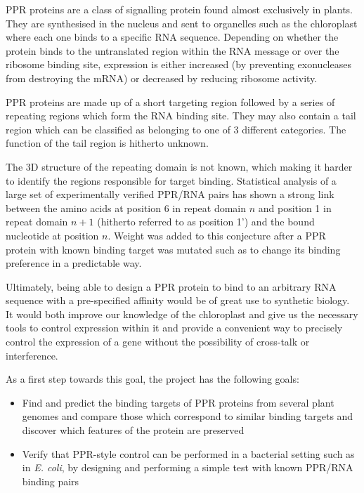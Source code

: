 \documentclass[twoside,a4paper]{article}
\begin{document}
\begin{multicols}{2}
PPR proteins are a class of signalling protein found almost exclusively in
plants\cite{Small2000}. 
They are synthesised in the nucleus and sent to organelles such as the 
chloroplast where each one binds to a specific RNA sequence.
Depending on whether the protein binds to the untranslated region within the
RNA message or over the ribosome binding site, expression is either increased 
(by preventing exonucleases from destroying the mRNA) or decreased by reducing 
ribosome activity\cite{Pfalz2009}.

PPR proteins are made up of a short targeting region followed by a series of
repeating regions which form the RNA binding site.
They may also contain a tail region which can be classified as
belonging to one of 3 different categories. 
The function of the tail region is hitherto unknown\cite{Lurin2004}.

The 3D structure of the repeating domain is not known, which making it harder
to identify the regions responsible for target binding.
Statistical analysis of a large set of experimentally verified PPR/RNA pairs
has shown a strong link between the amino acids at position 6 in repeat domain
$n$ and position 1 in repeat domain $n+1$ (hitherto referred to as position 1')
and the bound nucleotide at position $n$\cite{Barkan2012}.
Weight was added to this conjecture after a PPR protein with known binding
target was mutated such as to change its binding preference in a predictable
way\cite{Barkan2012}.

Ultimately, being able to design a PPR protein to bind to an arbitrary RNA
sequence with a pre-specified affinity would be of great use to synthetic
biology.
It would both improve our knowledge of the chloroplast and give us the
necessary tools to control expression within it and provide a convenient way to
precisely control the expression of a gene without the possibility of 
cross-talk or interference.

As a first step towards this goal, the project has the following goals:
\begin{itemize}
  \item Find and predict the binding targets of PPR proteins from several plant 
    genomes and compare those which correspond to
    similar binding targets and discover which features of the protein are
    preserved
  \item Verify that PPR-style control can be performed in a bacterial setting
    such as in \textit{E. coli}, by designing and performing a simple test 
    with known PPR/RNA binding pairs
\end{itemize}



\end{multicols}
\end{document}
